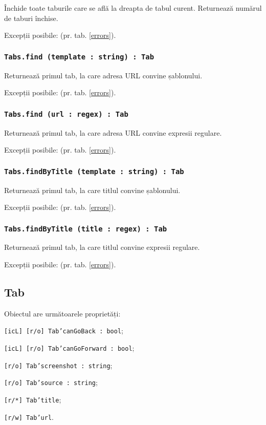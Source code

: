 Închide toate taburile care se află la dreapta de tabul curent. Returnează numărul de taburi închise.

Excepții posibile:  (pr. tab. \ref{errors}).

\subsubsection{\texttt{Tabs.find (template : string) : Tab}}

Returnează primul tab, la care adresa URL convine șablonului.

Excepții posibile:  (pr. tab. \ref{errors}).

\subsubsection{\texttt{Tabs.find (url : regex) : Tab}}

Returnează primul tab, la care adresa URL convine expresii regulare.

Excepții posibile:  (pr. tab. \ref{errors}).

\subsubsection{\texttt{Tabs.findByTitle (template : string) : Tab}}

Returnează primul tab, la care titlul convine șablonului.

Excepții posibile:  (pr. tab. \ref{errors}).

\subsubsection{\texttt{Tabs.findByTitle (title : regex) : Tab}}

Returnează primul tab, la care titlul convine expresii regulare.

Excepții posibile:  (pr. tab. \ref{errors}).

\subsection{{\color{orange} Tab}}

Obiectul \tab{} are următoarele proprietăți:
\begin{icItems}
	\item \texttt{[icL] [r/o] Tab'canGoBack : bool};
	\item \texttt{[icL] [r/o] Tab'canGoForward : bool};
	\item \texttt{[r/o] Tab'screenshot : string};
	\item \texttt{[r/o] Tab'source : string};
	\item \texttt{[r/*] Tab'title};
	\item \texttt{[r/w] Tab'url}.
\end{icItems}

